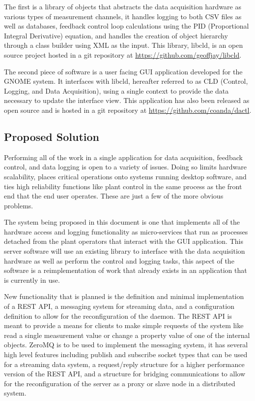       The first is a library of objects that abstracts the data acquisition
      hardware as various types of measurement channels, it handles logging
      to both CSV files as well as databases, feedback control loop
      calculations using the PID (Proportional Integral Derivative) equation,
      and handles the creation of object hierarchy through a class builder
      using XML as the input. This library, libcld, is an open source project
      hosted in a git repository at \url{https://github.com/geoffjay/libcld}.

      The second piece of software is a user facing GUI application developed for
      the GNOME system. It interfaces with libcld, hereafter referred to as
      CLD (Control, Logging, and Data Acquisition), using a single context to
      provide the data necessary to update the interface view. This application
      has also been released as open source and is hosted in a git repository
      at \url{https://github.com/coanda/dactl}.

  \subsection{Proposed Solution}\label{sec:desc-soln}

    Performing all of the work in a single application for data acquisition,
    feedback control, and data logging is open to a variety of issues. Doing so
    limits hardware scalability, places critical operations onto systems running
    desktop software, and ties high reliability functions like plant control in
    the same process as the front end that the end user operates. These are just
    a few of the more obvious problems.

    The system being proposed in this document is one that implements all of
    the hardware access and logging functionality as micro-services that run as
    processes detached from the plant operators that interact with the GUI
    application. This server software will use an existing library to interface
    with the data acquisition hardware as well as perform the control and
    logging tasks, this aspect of the software is a reimplementation of work
    that already exists in an application that is currently in use.

    New functionality that is planned is the definition and minimal
    implementation of a REST API, a messaging system for streaming data, and a
    configuration definition to allow for the reconfiguration of the daemon. The
    REST API is meant to provide a means for clients to make simple requests of
    the system like read a single measurement value or change a property value
    of one of the internal objects. ZeroMQ is to be used to implement the
    messaging system, it has several high level features including publish and
    subscribe socket types that can be used for a streaming data system, a
    request/reply structure for a higher performance version of the REST API,
    and a structure for bridging communications to allow for the reconfiguration
    of the server as a proxy or slave node in a distributed system.
